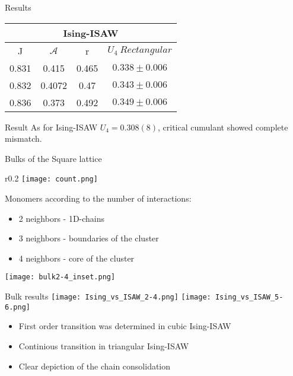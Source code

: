\documentclass{beamer}
\begin{document}
\begin{frame}{Results}

\begin{table}
\begin{tabular}{|c|c|c|c|}
        \hline
         \multicolumn{4}{|c|}{Ising-ISAW}  \\ \hline
         J & $\mathcal{A}$ & r & $U_{4}\  Rectangular$ \\ \hline
         0.831 & 0.415 & 0.465 & $0.338 \pm 0.006$\\ \hline
         0.832 & 0.4072 & 0.47 & $0.343 \pm 0.006$\\ \hline
         0.836 & 0.373 & 0.492 & $0.349 \pm 0.006$\\ \hline
\end{tabular}
\end{table}

\begin{block}{Result}
As for Ising-ISAW $U_4 = 0.308(8)$, critical cumulant showed \alert{complete mismatch}.
\end{block}

\end{frame}


\begin{frame}{Bulks of the Square lattice}
\begin{wrapfigure}{r}{0.2\textwidth}
    \centering
    \texttt{[image: count.png]}
    \label{fig:example_bulk}
\end{wrapfigure}
Monomers according to the number of interactions:
\begin{itemize}
\item 2 neighbors - 1D-chains
\item 3 neighbors - boundaries of the cluster
\item 4 neighbors - core of the cluster
\end{itemize}
\texttt{[image: bulk2-4\_inset.png]}
\end{frame}

\begin{frame}{Bulk results}
\texttt{[image: Ising\_vs\_ISAW\_2-4.png]}
\hfill
\texttt{[image: Ising\_vs\_ISAW\_5-6.png]}
\begin{itemize}
\item First order transition was determined in cubic Ising-ISAW
\item Continious transition in triangular Ising-ISAW
\item Clear depiction of the chain consolidation
\end{itemize}

\end{frame}
\end{document}
